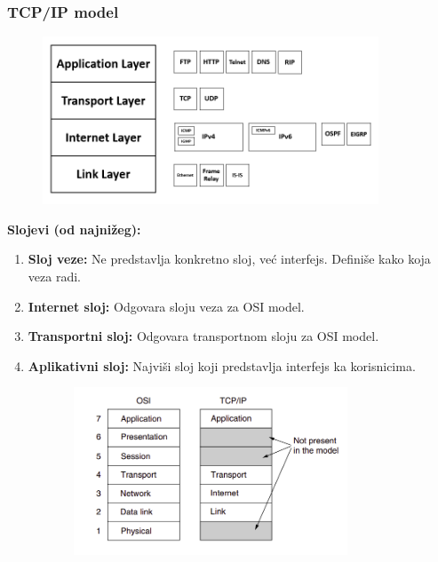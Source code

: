 \documentclass[a4paper]{article}
\begin{document}
        \subsubsection{TCP/IP model}
            \begin{figure}[H]
                \begin{center}
                    \includegraphics[width=100mm,height=50mm]{Slike/tcpip_model.png}
                \end{center}
            \end{figure}
            \textbf{Slojevi (od najnižeg):}
            \begin{enumerate}
                \item \textbf{Sloj veze:} Ne predstavlja konkretno sloj, već interfejs. 
                      Definiše kako koja veza radi.
                \item \textbf{Internet sloj:} Odgovara sloju veza za OSI model.
                \item \textbf{Transportni sloj:} Odgovara transportnom sloju za OSI model.
                \item \textbf{Aplikativni sloj:} Najviši sloj koji predstavlja interfejs ka korisnicima.
            \end{enumerate}
            \begin{figure}[H]
                \begin{center}
                    \includegraphics[width=100mm,height=50mm]{Slike/osi_vs_tcpip.png}
                \end{center}
            \end{figure}
\end{document}

